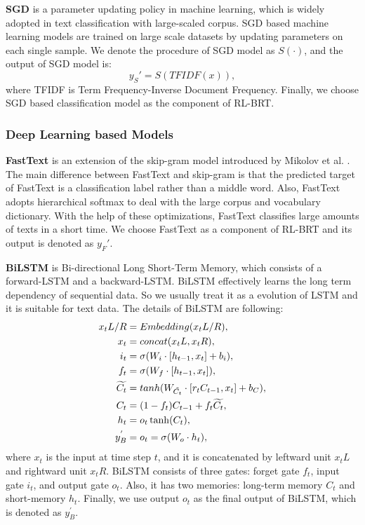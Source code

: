 \textbf{SGD} \cite{avriel2003nonlinear} is a parameter updating policy in machine learning, which is widely adopted in text classification with large-scaled corpus. SGD based machine learning models are trained on large scale datasets by updating parameters on each single sample. We denote the procedure of SGD model as $S(\cdot)$, and the output of SGD model is:
\begin{equation}\label{eq:sgd}
y_S' = S(TFIDF(x)),
\end{equation}
where TFIDF is Term Frequency-Inverse Document Frequency. Finally, we choose SGD based classification model as the component of RL-BRT.

\subsubsection{Deep Learning based Models}

\textbf{FastText} \cite{DBLP:journals/tacl/BojanowskiGJM17, DBLP:journals/corr/JoulinGBDJM16, DBLP:conf/eacl/GraveMJB17} is an extension of the skip-gram model introduced by Mikolov et al. \cite{DBLP:conf/nips/MikolovSCCD13}. The main difference between FastText and skip-gram is that the predicted target of FastText is a classification label rather than a middle word. Also, FastText adopts hierarchical softmax to deal with the large corpus and vocabulary dictionary. With the help of these optimizations, FastText classifies large amounts of texts in a short time. We choose FastText as a component of RL-BRT and its output is denoted as $y_F'$.

\textbf{BiLSTM} \cite{DBLP:journals/neco/HochreiterS97} is Bi-directional Long Short-Term Memory, which consists of a forward-LSTM and a backward-LSTM. BiLSTM effectively learns the long term dependency of sequential data. So we usually treat it as a evolution of LSTM and it is suitable for text data. The details of BiLSTM are following:
\begin{align}\label{eq:lstm}
x_tL/R &= Embedding(x_tL/R), \\
x_t &= concat(x_tL, x_tR), \\
i_t &= \sigma(W_i \cdot [h_{t-1}, x_t] + b_i),\\
f_t &= \sigma(W_f \cdot [h_{t-1}, x_t]),\\
\widetilde{C_t} &= tanh(W_{\tilde{C_t}} \cdot [r_t C_{t-1}, x_t]  + b_C),\\
C_t &= (1-f_t) C_{t-1} + f_t \widetilde{C_t},\\
h_t &=o_t \* \tanh(C_t),\\
y_B^{'} &= o_t =  \sigma(W_o \cdot h_t),
\end{align}
where $x_t$ is the input at time step $t$, and it is concatenated by leftward unit $x_tL$ and rightward unit $x_tR$. BiLSTM consists of three gates: forget gate $f_t$, input gate $i_t$, and output gate $o_t$. Also, it has two memories: long-term memory $C_t$ and short-memory $h_t$. Finally, we use output $o_t$ as the final output of BiLSTM, which is denoted as $y_B^{'}$.

